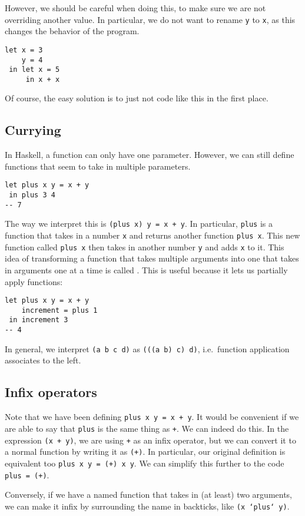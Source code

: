 \documentclass[class=scrartcl]{standalone}
\begin{document}
However, we should be careful when doing this, to make sure we are not
overriding another value.
In particular, we do not want to rename \texttt{y}
to \texttt{x}, as this changes the behavior of the program.
\begin{verbatim}
let x = 3
    y = 4
 in let x = 5
     in x + x
\end{verbatim}
Of course, the easy solution is to just not code like this in the first place.

\subsection{Currying}
In Haskell, a function can only have one parameter.
However, we can still define functions that
seem to take in multiple parameters.
\begin{verbatim}
let plus x y = x + y
 in plus 3 4
-- 7
\end{verbatim}
The way we interpret this is \texttt{(plus x) y = x + y}.
In particular, \texttt{plus} is a function that takes in
a number \texttt{x} and returns another function
\texttt{plus x}.
This new function called \texttt{plus x} then takes in
another number \texttt{y} and adds \texttt{x} to it.
This idea of transforming a function that takes multiple arguments
into one that takes in arguments one at a time is called .
This is useful because it lets us partially apply functions:
\begin{verbatim}
let plus x y = x + y
    increment = plus 1
 in increment 3
-- 4
\end{verbatim}
In general, we interpret \texttt{(a b c d)} as
\texttt{(((a b) c) d)}, i.e.\ function application
associates to the left.


\subsection{Infix operators}
Note that we have been defining \texttt{plus x y = x + y}.
It would be convenient if we are able to say that \texttt{plus}
is the same thing as \texttt{+}.
We can indeed do this. In the expression \texttt{(x + y)},
we are using \texttt{+} as an infix operator,
but we can convert it to a normal function by
writing it as \texttt{(+)}.
In particular, our original definition is equivalent too
\texttt{plus x y = (+) x y}.
We can simplify this further to the code \texttt{plus = (+)}.

Conversely, if we have a named function that takes in (at least) two arguments,
we can make it infix by surrounding the name in backticks, like
\texttt{(x `plus` y)}. %
\end{document}
